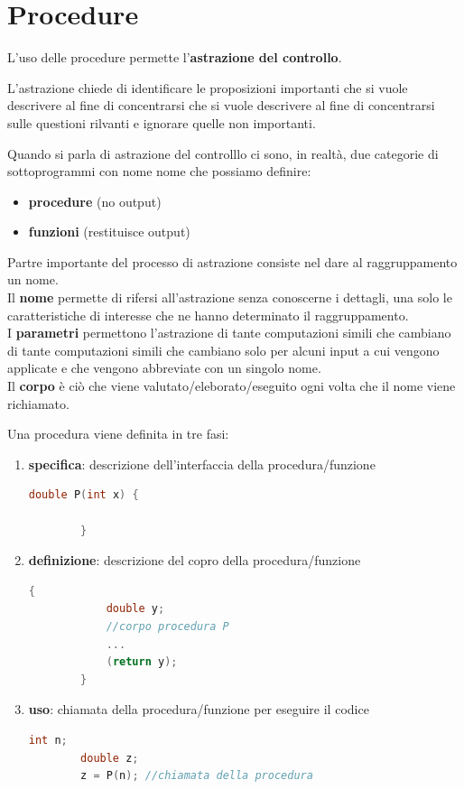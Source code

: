 
\chapter{Procedure}
L'uso delle procedure permette l'\textbf{astrazione del controllo}.


L'astrazione chiede di identificare le proposizioni importanti che si vuole descrivere al fine di concentrarsi che si vuole descrivere al fine di concentrarsi sulle questioni rilvanti e ignorare quelle non importanti.

\smallskip
Quando si parla di astrazione del controlllo ci sono, in realtà, due categorie di sottoprogrammi con nome nome che possiamo definire:
\begin{itemize}[label=$\diamond$, itemsep=\smallskipamount]
    \item \textbf{procedure} (no output)
    \item \textbf{funzioni} (restituisce output)
\end{itemize}

\smallskip
Partre importante del processo di astrazione consiste nel dare al raggruppamento un nome.\\[0.2ex]
Il \textbf{nome} permette di rifersi all'astrazione senza conoscerne i dettagli, una solo le caratteristiche di interesse che ne hanno determinato il raggruppamento.\\[0.2ex]
I \textbf{parametri} permettono l'astrazione di tante computazioni simili che cambiano di tante computazioni simili che cambiano solo per alcuni input a cui vengono applicate e che vengono abbreviate con un singolo nome.\\[0.2ex]
Il \textbf{corpo} è ciò che viene valutato/eleborato/eseguito ogni volta che il nome viene richiamato.

\smallskip
Una procedura viene definita in tre fasi:
\begin{enumerate}[itemsep=\smallskipamount]
    \item \textbf{specifica}: descrizione dell'interfaccia della procedura/funzione
    \begin{lstlisting}[language=C]
        double P(int x) {
            
        }
    \end{lstlisting}
    \item \textbf{definizione}: descrizione del copro della procedura/funzione
    \begin{lstlisting}[language=C]
        {
            double y;
            //corpo procedura P
            ...
            (return y);
        }
    \end{lstlisting}
    \item \textbf{uso}: chiamata della procedura/funzione per eseguire il codice
    \begin{lstlisting}[language=C]
        int n;
        double z;
        z = P(n); //chiamata della procedura
    \end{lstlisting}
\end{enumerate}

